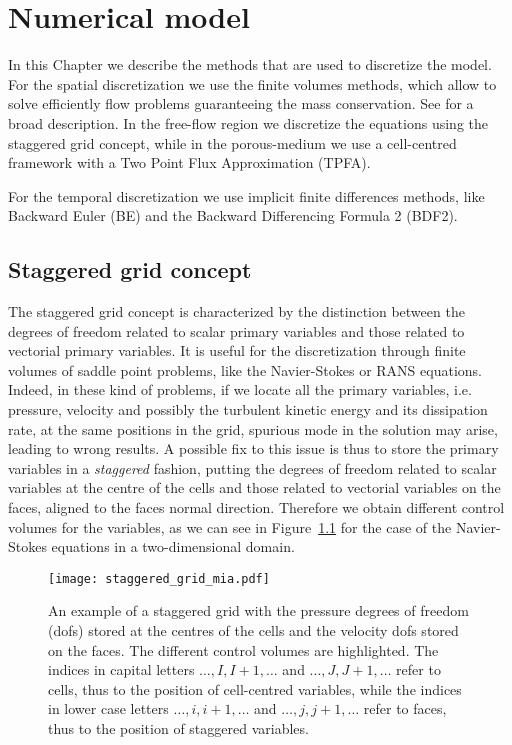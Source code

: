 \chapter{Numerical model} \label{chap:discretization} %
In this Chapter we describe the methods that are used to discretize the model. 
For the spatial discretization we use the finite volumes methods, which allow 
to solve efficiently flow problems guaranteeing the mass conservation. See 
\cite{fv:leveque} for a broad description.
In the free-flow region we discretize the equations using the staggered grid 
concept, while in the porous-medium we use a cell-centred framework with a Two 
Point Flux Approximation (TPFA).

For the temporal discretization we use implicit finite differences methods, 
like Backward Euler (BE) and the Backward Differencing Formula 2 (BDF2).
%
\section{Staggered grid concept}
The staggered grid concept is characterized by the distinction between the 
degrees of freedom related to scalar primary variables and those related to 
vectorial primary variables. It is useful for the discretization through finite 
volumes of saddle point problems, like the Navier-Stokes or RANS equations. 
Indeed, in these kind of problems, if we locate all the primary variables, i.e. 
pressure, velocity and possibly the turbulent kinetic energy and its 
dissipation rate, at the same positions in the grid, spurious mode in the 
solution may arise, leading to wrong results. A possible fix to this issue 
is thus to store the primary variables in a \emph{staggered} fashion, putting 
the degrees of freedom related to scalar variables at the centre of the cells 
and those related to vectorial variables on the faces, aligned to the faces 
normal direction. Therefore we obtain different control volumes for the 
variables, as we can see in Figure~\ref{fig:staggrid} for the case of the 
Navier-Stokes equations in a two-dimensional domain.
\begin{figure}[t]
	\centering
	\texttt{[image: staggered\_grid\_mia.pdf]}
	\caption[Staggered grid control volumes]{An example of a staggered grid 
	with the pressure degrees of freedom (dofs) stored at the centres of the 
	cells and the velocity dofs stored on the faces. The different control 
	volumes are highlighted. The indices in capital letters $\dots,I,I+1,\dots$ 
	and $\dots,J,J+1,\dots$ refer to cells, thus to the position of 
	cell-centred variables, while the indices in lower case letters 
	$\dots,i,i+1,\dots$ and $\dots,j,j+1,\dots$ refer to faces, thus to the 
	position of staggered variables.}
	\label{fig:staggrid}
\end{figure}

